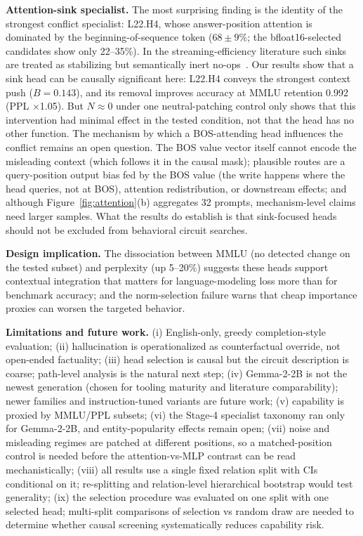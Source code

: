 \documentclass[paper]{ieice}
\newcommand{\emodel}{Gemma-2-2B}
\newcommand{\spec}{L22.H4}
\begin{document}
\textbf{Attention-sink specialist.} The most surprising finding is the
identity of the strongest conflict specialist: \spec{}, whose
answer-position attention is dominated by the beginning-of-sequence
token ($68\pm9\%$; the bfloat16-selected candidates show only
22--35\%). In the
streaming-efficiency literature such sinks are treated as stabilizing
but semantically inert no-ops~\cite{xiao2024sinks}. Our results show
that a sink head can be causally significant here: \spec{} conveys the
strongest context push ($B{=}0.143$), and its removal improves accuracy
at MMLU retention 0.992 (PPL $\times$1.05). But
$N\!\approx\!0$ under one neutral-patching control only shows that this
intervention had minimal effect in the tested condition, not that the
head has no other function. The
mechanism by which a BOS-attending head influences the conflict remains
an open question. The BOS value vector itself cannot encode the
misleading context (which follows it in the causal mask); plausible
routes are a query-position output bias fed by the BOS value (the
write happens where the head queries, not at BOS), attention
redistribution, or downstream effects; and although
Figure~\ref{fig:attention}(b) aggregates 32 prompts, mechanism-level
claims need larger samples. What the results do establish is that
sink-focused heads should not be excluded from behavioral circuit
searches.

\textbf{Design implication.} The dissociation between MMLU (no
detected change on the tested subset) and perplexity (up 5--20\%)
suggests these heads support contextual integration that matters for
language-modeling loss more than for benchmark accuracy; and the
norm-selection failure warns that cheap importance proxies can worsen
the targeted behavior.

\textbf{Limitations and future work.} (i) English-only, greedy
completion-style evaluation; (ii) hallucination is operationalized as
counterfactual override, not open-ended factuality; (iii) head selection
is causal but the circuit description is coarse; path-level analysis is
the natural next step; (iv) \emodel{} is not the newest generation
(chosen for tooling maturity and literature comparability); newer
families and instruction-tuned variants are future work; (v) capability
is proxied by MMLU/PPL subsets; (vi) the Stage-4 specialist taxonomy ran
only for \emodel{}, and entity-popularity effects remain open; (vii)
noise and misleading regimes are patched at different positions, so a
matched-position control is needed before the attention-vs-MLP contrast
can be read mechanistically; (viii) all results use a single fixed
relation split with CIs conditional on it; re-splitting and
relation-level hierarchical bootstrap would test generality; (ix) the
selection procedure was evaluated on one split with one selected head;
multi-split comparisons of selection vs random draw are needed to
determine whether causal screening systematically reduces capability
risk.
\end{document}
